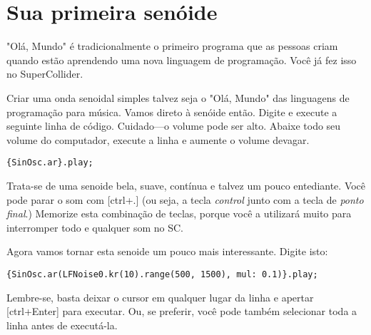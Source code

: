 \section{Sua primeira senóide \label{sec:first-sine}}


"Olá, Mundo" é tradicionalmente o primeiro programa que as pessoas criam quando estão aprendendo uma nova linguagem de programação. Você já fez isso no SuperCollider.

Criar uma onda senoidal simples talvez seja o "Olá, Mundo" das linguagens de programação para música. Vamos direto à senóide então. Digite e execute a seguinte linha de código. Cuidado---o volume pode ser alto. Abaixe todo seu volume do computador, execute a linha e aumente o volume devagar.
 
\begin{lstlisting}[style=SuperCollider-IDE, basicstyle=\scttfamily\footnotesize]
{SinOsc.ar}.play;
\end{lstlisting}
 

Trata-se de uma senoide bela, suave, contínua e talvez um pouco entediante. Você pode parar o som com [ctrl+.] (ou seja, a tecla \emph{control} junto com a tecla de \emph{ponto final}.) Memorize esta combinação de teclas, porque você a utilizará muito para interromper todo e qualquer som no SC.

\bigskip
{}
\bigskip

Agora vamos tornar esta senoide um pouco mais interessante. Digite isto:

 
\begin{lstlisting}[style=SuperCollider-IDE, basicstyle=\scttfamily\footnotesize ]
{SinOsc.ar(LFNoise0.kr(10).range(500, 1500), mul: 0.1)}.play;
\end{lstlisting}
 

Lembre-se, basta deixar o cursor em qualquer lugar da linha e apertar [ctrl+Enter] para executar. Ou, se preferir, você pode também selecionar toda a linha antes de executá-la.

 
\bigskip
{}
